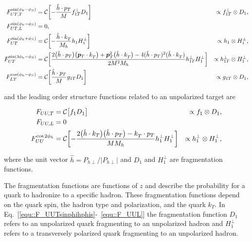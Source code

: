 \begin{align}
  \label{equ::F_UUTsinphihphis}
  F_{UT ,T}^{\sin\left(\phi_h -\phi_S\right)} &=
  {\cal C}\biggl[-\frac{\hat{h} \cdot p_T}{M} f_{1T}^{\perp } D_1\biggr]
  &\propto f_{1T}^{\perp } \otimes D_1, \\
  F_{UT ,L}^{\sin\left(\phi_h -\phi_S\right)} &= 0,\\
  F_{UT}^{\sin(\phi_h +\phi_S)} &=
  {\cal C}\biggl[-\frac{\hat{h}\cdot k_T^{}}{M_h} h_{1} H_1^{\perp }\biggr]
  &\propto h_{1} \otimes H_1^{\perp },\\
  F_{UT}^{\sin(3\phi_h -\phi_S)} &=
  {\cal C}\biggl[ \frac{2 \bigl(\hat{h}\cdot
      p_T \bigr) \bigl( \bm{p}_T\cdot k_T^{} \bigr) +\bm{p}_T^2
      \bigl(\hat{h}\cdot k_T^{} \bigr) -4 (\hat{h}\cdot p_T)^2 (\hat{h}\cdot
      k_T^{})}{2 M^2 M_h} h_{1T}^{\perp } H_1^{\perp }\biggr]
  &\propto h_{1T}^{\perp } \otimes H_1^{\perp },\\
  \label{equ::F_LTcosphihphis}
  F_{LT}^{\cos(\phi_h -\phi_S)}
  &={\cal C}\biggl[ \frac{\hat{h} \cdot p_T}{M} g_{1T}
    D_1 \biggr]
  &\propto g_{1T} \otimes D_1, 
\end{align}

\noindent
and the leading order structure functions related to an unpolarized target are

\begin{align}
  F_{UU ,T} &= {\cal C}\bigl[ f_1 D_1 \bigr] &\propto f_1 \otimes D_1, \\
  \label{equ::F_UUL}
  F_{UU ,L} &= 0 \\
  \label{equ::F_UUcos2phi}
  F_{UU}^{\cos 2\phi_h} &= {\cal C}\biggl[
   - \frac{2 \bigl( \hat{h} \cdot k_T \bigr)
     \bigl( \hat{h} \cdot p_T \bigr)
     -k_T^{} \cdot p_T}{M M_h}
   h_{1}^{\perp } H_{1}^{\perp }\biggr]
  &\propto h_1^{\perp} \otimes H_1^{\perp}, 
\end{align}

\noindent
where the unit vector $\hat{h}=P_{h \perp}/|P_{h\perp}|$ and $D_1$ and
$H_1^{\perp}$ are fragmentation functions.

The fragmentation functions are functions of $z$ and describe the probability
for a quark to hadronize to a specific hadron.  These fragmentation functions
depend on the quark spin, the hadron type and polarization, and the quark $k_T$.
In Eq.~[\ref{equ::F_UUTsinphihphis}-~\ref{equ::F_UUL}] the fragmentation
function $D_1$ refers to an unpolarized quark fragmenting to an unpolarized
hadron and $H_1^{\perp}$ refers to a transversely polarized quark fragmenting to
an unpolarized hadron.

